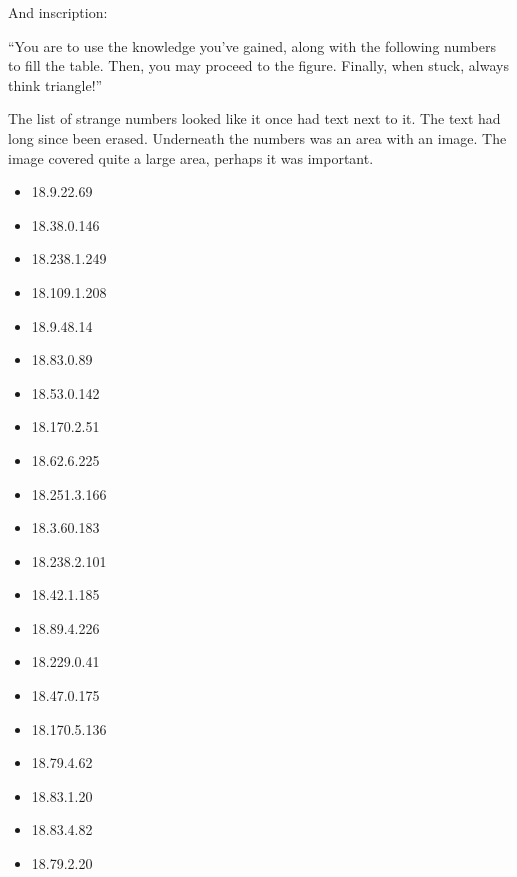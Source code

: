 \documentclass[12pt]{article}
\begin{document}
And inscription:

\begin{center}
``You are to use the knowledge you've gained, along with the following numbers to fill the table. Then, you may proceed to the figure. Finally, when stuck, always think triangle!''
\end{center}

\vspace{.2in}


The list of strange numbers looked like it once had text next to it. The text had long since been erased. Underneath
the numbers was an area with an image. The image covered quite a large area, perhaps it was important.

\newpage

\begin{multicols}{3}
    \begin{itemize}
        \item 18.9.22.69
        \item 18.38.0.146
        \item 18.238.1.249
        \item 18.109.1.208
        \item 18.9.48.14
        \item 18.83.0.89
        \item 18.53.0.142
        \item 18.170.2.51 
        \item 18.62.6.225
        \item 18.251.3.166
        \item 18.3.60.183
        \item 18.238.2.101
        \item 18.42.1.185
        \item 18.89.4.226
        \item 18.229.0.41
        \item 18.47.0.175 
        \item 18.170.5.136
        \item 18.79.4.62
        \item 18.83.1.20
        \item 18.83.4.82
        \item 18.79.2.20
    \end{itemize}
\end{multicols}

\vspace{.4in}
\end{document}
